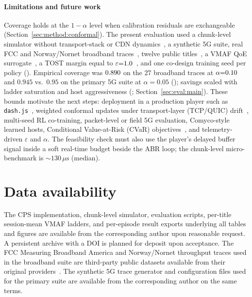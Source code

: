\paragraph{Limitations and future work}
\label{sec:limits}
Coverage holds at the \(1{-}\alpha\) level when calibration residuals are exchangeable (Section~\ref{sec:method:conformal}).
The present evaluation used a chunk-level simulator without transport-stack or CDN dynamics~\cite{narayanan2021variegated}, a synthetic \mbox{5G} suite, real FCC and Norway/Nornet broadband traces~\cite{fcc2015mba,kvalbein2014}, twelve public titles~\cite{blenderfilms,xiphderf}, a VMAF QoE surrogate~\cite{seufert2015survey}, a TOST margin equal to \(\varepsilon{=}1.0\)~\cite{menon2022perceptual,lakens2017equivalence}, and one co-design training seed per policy ().
Empirical coverage was \(0.890\) on the 27 broadband traces at \(\alpha{=}0.10\) and \(0.945\) vs.\ \(0.95\) on the primary \mbox{5G} suite at \(\alpha{=}0.05\) (); savings scaled with ladder saturation and host aggressiveness (; Section~\ref{sec:eval:main}).
These bounds motivate the next steps: deployment in a production player such as \texttt{dash.js}~\cite{spiteri2018dashjs}, weighted conformal updates under transport-layer (TCP/QUIC) drift~\cite{barber2023beyond,angelopoulos2024online}, multi-seed RL co-training, packet-level or field \mbox{5G} evaluation, Comyco-style learned hosts, Conditional Value-at-Risk (CVaR) objectives~\cite{rockafellar2000}, and telemetry-driven \(\varepsilon\) and \(\alpha\).
The feasibility check must also use the player's delayed buffer signal inside a soft real-time budget beside the ABR loop; the chunk-level micro-benchmark is \(\sim\!130\,\mu\mathrm{s}\) (median).

\section*{Data availability}
The CPS implementation, chunk-level simulator, evaluation scripts, per-title session-mean VMAF ladders, and per-episode result exports underlying all tables and figures are available from the corresponding author upon reasonable request.
A persistent archive with a DOI is planned for deposit upon acceptance.
The FCC Measuring Broadband America and Norway/Nornet throughput traces used in the broadband suite are third-party public datasets available from their original providers~\cite{fcc2015mba,kvalbein2014}.
The synthetic \mbox{5G} trace generator and configuration files used for the primary suite are available from the corresponding author on the same terms.

